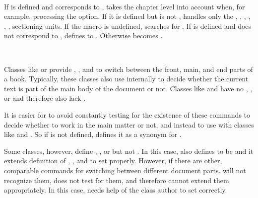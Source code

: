 \begin{Declaration}
  \ \ \ %
  \ %
\end{Declaration}
If  is defined and corresponds to
,  takes the chapter level
into account when, for example, processing the
 option. If it is defined but is not
,  handles only the
, ,
, ,
, ,
 sectioning units. If the macro is undefined,
 searches for . If
 is defined and does not correspond to
,  defines  to
. Otherwise  becomes
.%
\EndIndexGroup


\begin{Declaration}
  \ \ %
  \ \ %
\end{Declaration}
Classes like  or  provide
,
, and
 to switch between the
front, main, and end parts of a book. Typically, these classes also use
 internally to decide whether the current text is part of
the main body of the document or not. Classes like  and
 have no ,
, or  and
therefore also lack .

It is easier for  to avoid constantly testing for the
existence of these commands to decide whether to work in the main matter or
not, and instead to use   with classes
like  and . So if  is not
defined,  defines it as a synonym for .

Some classes, however, define ,
, or  but not
. In this case,  also defines
 to be  and it extends definition of
, , and
 to set  properly.
However, if there are other, comparable commands for switching between
different document parts.  will not recognize them, does not
test for them, and therefore cannot extend them appropriately. In this case,
 needs help of the class author to set 
correctly.%
\EndIndexGroup


